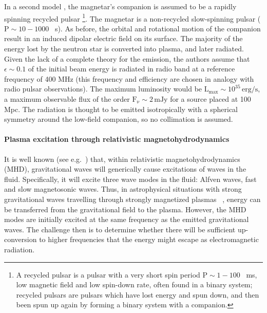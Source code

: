\documentclass[epsf]{article}
\begin{document}
In a second model \cite{Hansen:2000am}, the magnetar's companion is
assumed to be a rapidly spinning recycled pulsar \footnote{A recycled pulsar is a pulsar with a very short spin period $\mathrm{P}
\sim 1-100$ ~ms, low magnetic field and low spin-down rate, often found in a binary system; recycled pulsars are pulsars which have lost energy and spun down, and then been spun up again by forming a binary system with a companion.}. The magnetar is a
non-recycled slow-spinning pulsar ($\mathrm{P} \sim 10-1000$ ~s). As before,
the orbital and rotational motion of the companion result in an
induced dipolar electric field on its surface.  The majority of the
energy lost by the neutron star is converted into plasma, and later
radiated.  Given the lack of a complete theory for the emission, the
authors assume that $\epsilon \sim 0.1$ of the initial beam energy
is radiated in radio band at a reference frequency of 400 MHz (this
frequency and efficiency are chosen in analogy with radio pulsar
observations).  The maximum luminosity would be $\mathrm{L_{max}}\sim 10^{35}\,\mathrm{erg/s}$, a maximum observable flux of the order
$\mathrm{F_{\nu} \sim 2\,mJy}$ for a source placed at 100 Mpc. The radiation is thought to be emitted isotropically with a spherical symmetry around the low-field companion, so no collimation is assumed.


\paragraph{Plasma excitation through relativistic magnetohydrodynamics}

It is well known (see
e.g.~\cite{Duez:2005sg,Duez:2005sf,Moortgat:2005fs,Moortgat:2004xz})
that, within relativistic magnetohydrodynamics (MHD), gravitational
waves will generically cause excitations of waves in the fluid.
Specifically, it will excite three wave modes in the fluid: Alfven
waves, fast and slow magnetosonic waves.  Thus, in
astrophysical situations with strong gravitational waves travelling
through strongly magnetized plasmas ~\cite{Moortgat:2004xz}, energy
can be transferred from the gravitational field to the plasma.
However, the MHD modes are initially excited at the same frequency
as the emitted gravitational waves.  The challenge then is to
determine whether there will be sufficient up-conversion to higher
frequencies that the energy might escape as electromagnetic
radiation.
\end{document}

